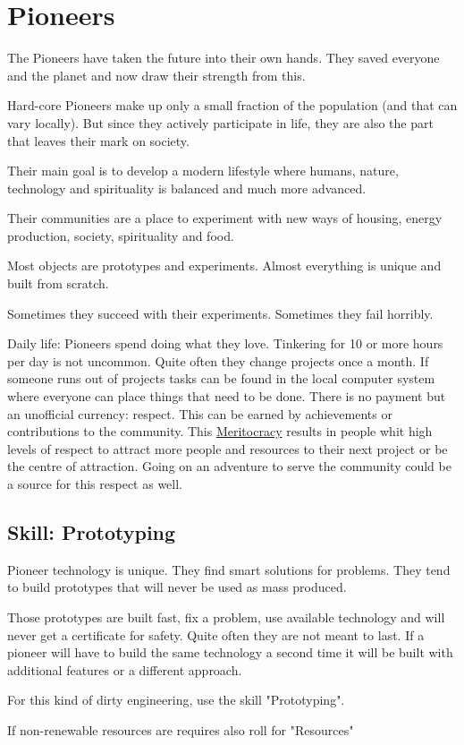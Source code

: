 \section{Pioneers}

The Pioneers have taken the future into their own hands. They saved everyone and the planet and now draw their strength from this.

Hard-core Pioneers make up only a small fraction of the population (and that can vary locally). But since they actively participate in life, they are also the part that leaves their mark on society.

Their main goal is to develop a modern lifestyle where humans, nature, technology and spirituality is balanced and much more advanced.

Their communities are a place to experiment with new ways of housing, energy production, society, spirituality and food.

Most objects are prototypes and experiments. Almost everything is unique and built from scratch.

Sometimes they succeed with their experiments. Sometimes they fail horribly.


Daily life: Pioneers spend doing what they love. Tinkering for 10 or more hours per day is not uncommon. Quite often they change projects once a month. If someone runs out of projects tasks can be found in the local computer system where everyone can place things that need to be done. There is no payment but an unofficial currency: respect. This can be earned by achievements or contributions to the community. This \hyperref[sec:meritocracy]{Meritocracy} results in people whit high levels of respect to attract more people and resources to their next project or be the centre of attraction.
Going on an adventure to serve the community could be a source for this respect as well.

\subsection{Skill: Prototyping}

Pioneer technology is unique. They find smart solutions for problems. They tend to build prototypes that will never be used as mass produced.

Those prototypes are built fast, fix a problem, use available technology and will never get a certificate for safety.
Quite often they are not meant to last.
If a pioneer will have to build the same technology a second time it will be built with additional features or a different approach.

For this kind of dirty engineering, use the skill "Prototyping".

If non-renewable resources are requires also roll for "Resources"

